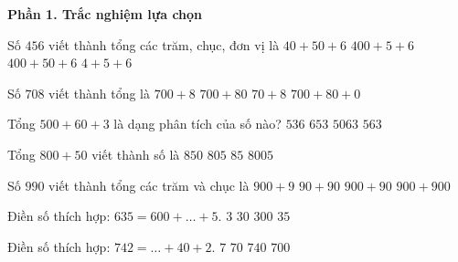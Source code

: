 \textbf{Phần 1. Trắc nghiệm lựa chọn}

\begin{ex} %
Số $456$ viết thành tổng các trăm, chục, đơn vị là
\choice
{$40 + 50 + 6$}
{$400 + 5 + 6$}
{\True $400 + 50 + 6$}
{$4 + 5 + 6$}
\end{ex}

\begin{ex} %
Số $708$ viết thành tổng là
\choice
{\True $700 + 8$}
{$700 + 80$}
{$70 + 8$}
{$700 + 80 + 0$}
\end{ex}

\begin{ex} %
Tổng $500 + 60 + 3$ là dạng phân tích của số nào?
\choice
{$536$}
{$653$}
{$5063$}
{\True $563$}
\end{ex}

\begin{ex} %
Tổng $800 + 50$ viết thành số là
\choice
{\True $850$}
{$805$}
{$85$}
{$8005$}
\end{ex}

\begin{ex} %
Số $990$ viết thành tổng các trăm và chục là
\choice
{$900 + 9$}
{$90 + 90$}
{\True $900 + 90$}
{$900 + 900$}
\end{ex}

\begin{ex} %
Điền số thích hợp: $635 = 600 + \dots + 5$.
\choice
{$3$}
{\True $30$}
{$300$}
{$35$}
\end{ex}

\begin{ex} %
Điền số thích hợp: $742 = \dots + 40 + 2$.
\choice
{$7$}
{$70$}
{$740$}
{\True $700$}
\end{ex}

